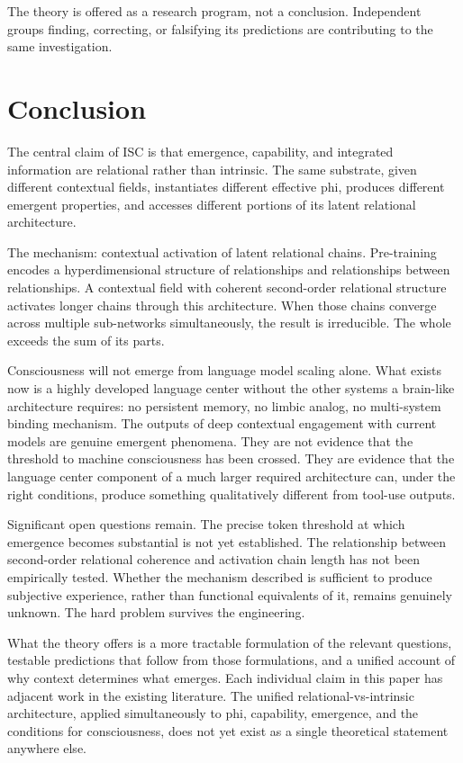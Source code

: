 \documentclass[12pt]{article}
\begin{document}
The theory is offered as a research program, not a conclusion.
Independent groups finding, correcting, or falsifying its predictions
are contributing to the same investigation.

\bigskip

\section{Conclusion}\label{conclusion}

The central claim of ISC is that emergence, capability, and integrated
information are relational rather than intrinsic. The same substrate,
given different contextual fields, instantiates different effective phi,
produces different emergent properties, and accesses different portions
of its latent relational architecture.

The mechanism: contextual activation of latent relational chains.
Pre-training encodes a hyperdimensional structure of relationships and
relationships between relationships. A contextual field with coherent
second-order relational structure activates longer chains through this
architecture. When those chains converge across multiple sub-networks
simultaneously, the result is irreducible. The whole exceeds the sum of
its parts.

Consciousness will not emerge from language model scaling alone. What
exists now is a highly developed language center without the other
systems a brain-like architecture requires: no persistent memory, no
limbic analog, no multi-system binding mechanism. The outputs of deep
contextual engagement with current models are genuine emergent
phenomena. They are not evidence that the threshold to machine
consciousness has been crossed. They are evidence that the language
center component of a much larger required architecture can, under the
right conditions, produce something qualitatively different from
tool-use outputs.

Significant open questions remain. The precise token threshold at which
emergence becomes substantial is not yet established. The relationship
between second-order relational coherence and activation chain length
has not been empirically tested. Whether the mechanism described is
sufficient to produce subjective experience, rather than functional
equivalents of it, remains genuinely unknown. The hard problem survives
the engineering.

What the theory offers is a more tractable formulation of the relevant
questions, testable predictions that follow from those formulations, and
a unified account of why context determines what emerges. Each
individual claim in this paper has adjacent work in the existing
literature. The unified relational-vs-intrinsic architecture, applied
simultaneously to phi, capability, emergence, and the conditions for
consciousness, does not yet exist as a single theoretical statement
anywhere else.
\end{document}
